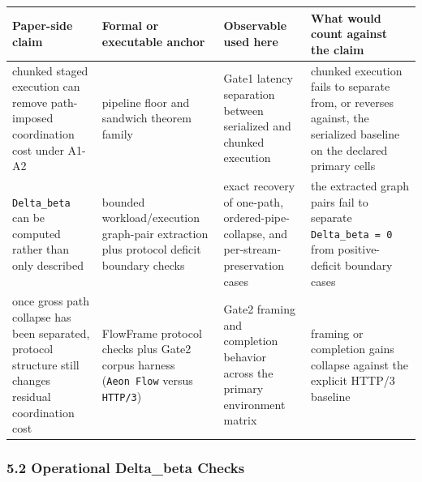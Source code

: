 \documentclass[
  11pt,
]{article}
\newcounter{none} %
\begin{document}
{\def\LTcaptype{none} %
\begin{longtable}[]{@{}
  >{\raggedright\arraybackslash}p{}
  >{\raggedright\arraybackslash}p{}
  >{\raggedright\arraybackslash}p{}
  >{\raggedright\arraybackslash}p{}@{}}
\toprule\noalign{}
\begin{minipage}[b]{\linewidth}\raggedright
Paper-side claim
\end{minipage} & \begin{minipage}[b]{\linewidth}\raggedright
Formal or executable anchor
\end{minipage} & \begin{minipage}[b]{\linewidth}\raggedright
Observable used here
\end{minipage} & \begin{minipage}[b]{\linewidth}\raggedright
What would count against the claim
\end{minipage} \\
\midrule\noalign{}
\endhead
\bottomrule\noalign{}
\endlastfoot
chunked staged execution can remove path-imposed coordination cost under
A1-A2 & pipeline floor and sandwich theorem family & Gate1 latency
separation between serialized and chunked execution & chunked execution
fails to separate from, or reverses against, the serialized baseline on
the declared primary cells \\
\texttt{Delta\_beta} can be computed rather than only described &
bounded workload/execution graph-pair extraction plus protocol deficit
boundary checks & exact recovery of one-path, ordered-pipe-collapse, and
per-stream-preservation cases & the extracted graph pairs fail to
separate \texttt{Delta\_beta\ =\ 0} from positive-deficit boundary
cases \\
once gross path collapse has been separated, protocol structure still
changes residual coordination cost & FlowFrame protocol checks plus
Gate2 corpus harness (\texttt{Aeon\ Flow} versus \texttt{HTTP/3}) &
Gate2 framing and completion behavior across the primary environment
matrix & framing or completion gains collapse against the explicit
HTTP/3 baseline \\
\end{longtable}
}

\subsubsection{5.2 Operational Delta\_beta
Checks}\label{operational-delta_beta-checks}
\end{document}
